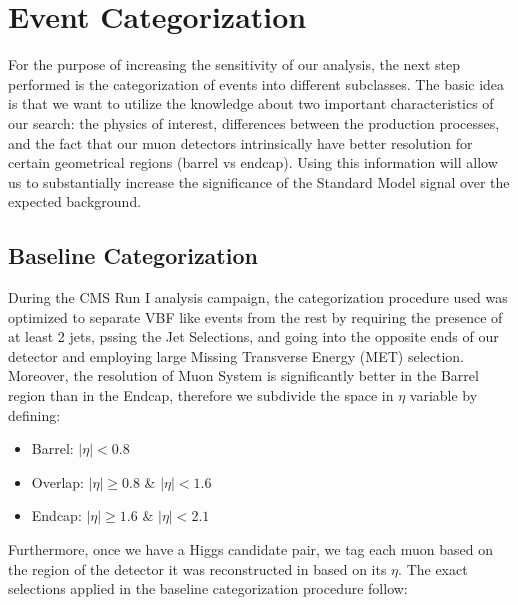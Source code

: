 \section{Event Categorization}
For the purpose of increasing the sensitivity of our analysis, the next step performed is the categorization of events into different subclasses. The basic idea is that we want to utilize the knowledge about two important characteristics of our search: the physics of interest, differences between the production processes, and the fact that our muon detectors intrinsically have better resolution for certain geometrical regions (barrel vs endcap). Using this information will allow us to substantially increase the significance of the Standard Model signal over the expected background.

\subsection{Baseline Categorization}
During the CMS Run I analysis campaign, the categorization procedure used was optimized to separate VBF like events from the rest by requiring the presence of at least 2 jets, pssing the Jet Selections, and going into the opposite ends of our detector and employing large Missing Transverse Energy (MET) selection. Moreover, the resolution of Muon System is significantly better in the Barrel region than in the Endcap, therefore we subdivide the space in $\eta$ variable by defining:
\begin{itemize}
  \item Barrel: $|\eta| < 0.8$
  \item Overlap: $|\eta| \ge 0.8$ \& $|\eta| < 1.6$
  \item Endcap: $|\eta| \ge 1.6$ \& $|\eta| < 2.1$
\end{itemize}
Furthermore, once we have a Higgs candidate pair, we tag each muon based on the region of the detector it was reconstructed in based on its $\eta$. The exact selections applied in the baseline categorization procedure follow:
